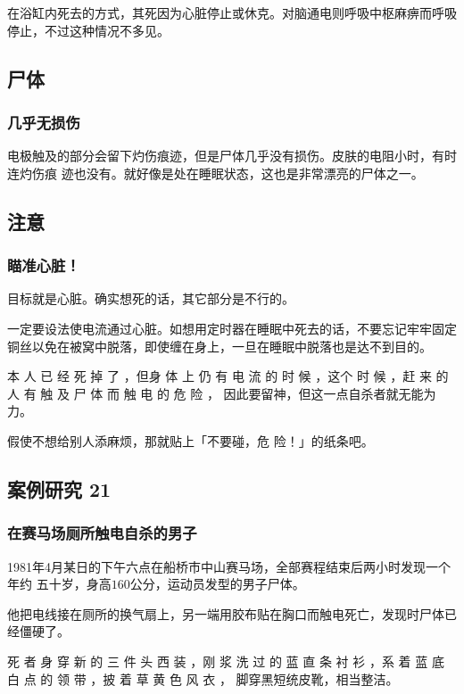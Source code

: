 \documentclass[UTF8]{ctexart}
\begin{document}
在浴缸内死去的方式，其死因为心脏停止或休克。对脑通电则呼吸中枢麻痹而呼吸停止，不过这种情况不多见。

\subsection{尸体}

\subsubsection*{几乎无损伤}

电极触及的部分会留下灼伤痕迹，但是尸体几乎没有损伤。皮肤的电阻小时，有时连灼伤痕
迹也没有。就好像是处在睡眠状态，这也是非常漂亮的尸体之一。

\subsection{注意}

\subsubsection*{瞄准心脏！}

目标就是心脏。确实想死的话，其它部分是不行的。

一定要设法使电流通过心脏。如想用定时器在睡眠中死去的话，不要忘记牢牢固定铜丝以免在被窝中脱落，即使缠在身上，一旦在睡眠中脱落也是达不到目的。

本 人 已 经 死 掉 了 ，但身 体 上 仍 有 电 流 的 时 候 ，这个 时 候 ，赶 来 的 人 有 触 及 尸 体 而 触 电 的 危 险 ， 因此要留神，但这一点自杀者就无能为力。

假使不想给别人添麻烦，那就贴上「不要碰，危 险！」的纸条吧。




\subsection{案例研究 21}

\subsubsection*{在赛马场厕所触电自杀的男子}

1981年4月某日的下午六点在船桥市中山赛马场，全部赛程结束后两小时发现一个年约
五十岁，身高$160$公分，运动员发型的男子尸体。

他把电线接在厕所的换气扇上，另一端用胶布贴在胸口而触电死亡，发现时尸体已经僵硬了。

死 者 身 穿 新 的 三 件 头 西 装 ，刚 浆 洗 过 的 蓝 直 条 衬 衫 ，系 着 蓝 底 白 点 的 领 带 ，披 着 草 黄 色 风 衣 ， 脚穿黑短统皮靴，相当整洁。
\end{document}
